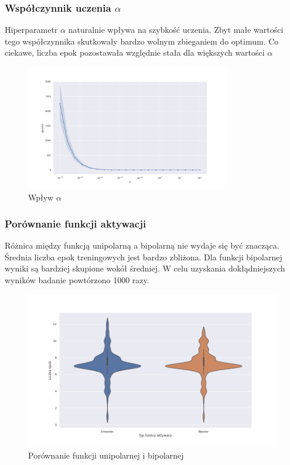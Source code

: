 \documentclass{article}
\begin{document}
\FloatBarrier
\subsubsection{Współczynnik uczenia $\alpha$}
Hiperparametr $\alpha$ naturalnie wpływa na szybkość uczenia.
Zbyt małe wartości tego współczynnika skutkowały bardzo wolnym zbieganiem do optimum.
Co ciekawe, liczba epok pozostawała względnie stała dla większych wartości $\alpha$

\begin{figure}[h]
  \caption{Wpływ $\alpha$ }
  \centering
    \includegraphics[width=0.8\textwidth]{images/04_per_lr.png}
\end{figure}

\FloatBarrier
\subsubsection{Porównanie funkcji aktywacji}
Różnica między funkcją unipolarną a bipolarną nie wydaje się być znacząca.
Średnia liczba epok treningowych jest bardzo zbliżona.
Dla funkcji bipolarnej wyniki są bardziej skupione wokół średniej.
W celu uzyskania dokłądniejszych wyników badanie powtórzono 1000 razy.

\begin{figure}[h]
  \caption{Porównanie funkcji unipolarnej i bipolarnej}
  \centering
    \includegraphics[width=1\textwidth]{images/05_per_uni_bi.png}
\end{figure}
\end{document}
